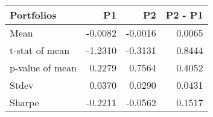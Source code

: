 \begin{tabular}{lrrr}
\toprule
Portfolios & P1 & P2 & P2 - P1 \\
\midrule
Mean & -0.0082 & -0.0016 & 0.0065 \\
t-stat of mean & -1.2310 & -0.3131 & 0.8444 \\
p-value of mean & 0.2279 & 0.7564 & 0.4052 \\
Stdev & 0.0370 & 0.0290 & 0.0431 \\
Sharpe & -0.2211 & -0.0562 & 0.1517 \\
\bottomrule
\end{tabular}
